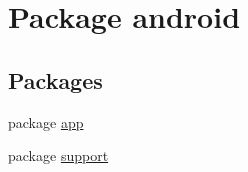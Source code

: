 \hypertarget{namespaceandroid}{}\section{Package android}
\label{namespaceandroid}
\subsection*{Packages}
\begin{DoxyCompactItemize}
\item 
package \hyperlink{namespaceandroid_1_1app}{app}
\item 
package \hyperlink{namespaceandroid_1_1support}{support}
\end{DoxyCompactItemize}
